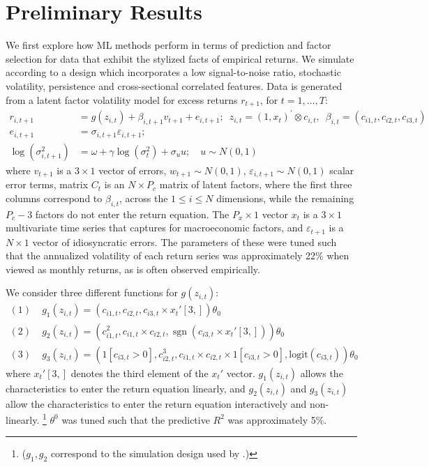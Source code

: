\documentclass{article}
\begin{document}
\section{Preliminary Results}
We first explore how ML methods perform in terms of prediction and factor selection for data that exhibit the stylized facts of empirical returns. We simulate according to a design which incorporates a low signal-to-noise ratio, stochastic volatility, persistence and cross-sectional correlated features. Data is generated from a latent factor volatility model for excess returns $r_{t+1}$, for $t=1, \dots, T$:
\begin{align*}
r_{i, t+1} &= 
g\left(z_{i, t}\right) + \beta_{i,t+1}v_{t+1} + e_{i, t+1}; 
\enspace z_{i, t} = \left(1, x_{t}\right)^{\prime} \otimes c_{i, t}, 
\enspace \beta_{i, t} = \left(c_{i 1, t}, c_{i 2, t}, c_{i 3, t}\right) \\ 
e_{i, t+1} &= 
\sigma_{i, t+1} \varepsilon_{i, t+1}; \\
\operatorname{log} (\sigma^2_{i,t+1}) &= 
\omega + \gamma \operatorname{log} (\sigma^2_{t}) + \sigma_{u}u;
\quad u \sim N(0, 1)
\end{align*}
where $v_{t+1}$ is a $3\times 1$ vector of errors, $w_{t+1} \sim N(0, 1)$,  $\varepsilon_{i,t+1} \sim N(0, 1)$ scalar error terms, matrix $C_t$ is an $N\times P_c$ matrix of latent factors, where the first three columns correspond to $\beta_{i,t}$, across the $1\leq i\leq N$ dimensions, while the remaining $P_c-3$ factors do not enter the return equation. The $P_x\times1$ vector $x_t$ is a $3 \times 1$ multivariate time series that captures for macroeconomic factors, and $\varepsilon_{t+1}$ is a $N\times 1$ vector of idiosyncratic errors. The parameters of these were tuned such that the annualized volatility of each return series was approximately 22\% when viewed as monthly returns, as is often observed empirically.

We consider three different functions for $g(z_{i, t})$:
\begin{align*}
(1)\; & g_1 \left(z_{i, t}\right)=\left(c_{i 1, t}, c_{i 2, t}, c_{i 3, t} \times x_{t}'[3,]\right) \theta_{0} \\
(2)\; & g_2 \left(z_{i, t}\right)=\left(c_{i 1, t}^{2}, c_{i 1, t} \times c_{i 2, t}, \operatorname{sgn}\left(c_{i 3, t} \times  x_{t}'[3,]\right)\right) \theta_{0} \\
(3)\; & g_3 \left(z_{i, t}\right) = \left(1[c_{i3,t}>0],c_{i 2, t}^{3}, c_{i 1, t} \times c_{i 2, t}\times 1[c_{i3,t}>0], \text{logit}\left({c}_{i3, t} \right)\right) \theta_{0}
\end{align*}
where $x_{t}'[3,]$ denotes the third element of the $x_{t}'$ vector.
$g_1 \left(z_{i, t}\right)$ allows the characteristics to enter the return equation linearly, and $g_2 \left(z_{i, t}\right)$ and $g_3 \left(z_{i, t}\right)$ allow the characteristics to enter the return equation interactively and non-linearly. \footnote{($g_1, g_2$ correspond to the simulation design used by \cite{gu_empirical_2018}.)} $\theta^0$ was tuned such that the predictive $R^2$ was approximately 5\%.
\end{document}
